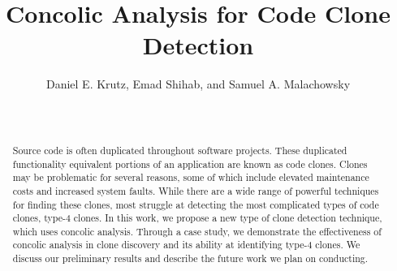 \documentclass{sig-alternate}
\begin{document}
%

\title{Concolic Analysis for Code Clone Detection} %

%
\author{
%
\alignauthor
Daniel E. Krutz,  Emad Shihab, and Samuel A. Malachowsky\\ 	
	\\
       \\
} %

\maketitle



\begin{abstract}

Source code is often duplicated throughout software projects. These duplicated functionality equivalent portions of an application are known as code clones. Clones may be problematic for several reasons, some of which include elevated maintenance costs and increased system faults. While there are a wide range of powerful techniques for finding these clones, most struggle at detecting the most complicated types of code clones, type-4 clones. In this work, we propose a new type of clone detection technique, which uses concolic analysis. Through a case study, we demonstrate the effectiveness of concolic analysis in clone discovery and its ability at identifying type-4 clones. We discuss our preliminary results and describe the future work we plan on conducting.



\end{abstract}
\end{document}
